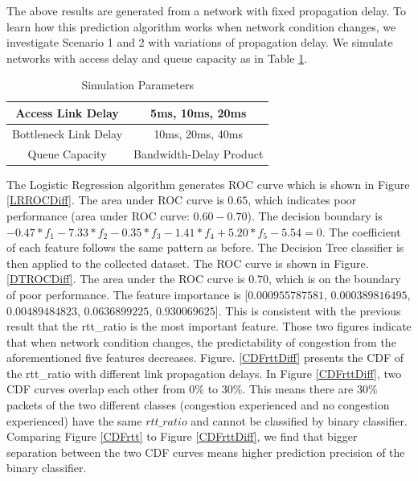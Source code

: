 
\par The above results are generated from a network with fixed propagation delay. To learn how this prediction algorithm works when network condition changes, we investigate Scenario 1 and 2 with variations of propagation delay. We simulate networks with access delay and queue capacity as in Table \ref{tab:varyRTT}.
\begin{table}
\begin{center}
\caption {Simulation Parameters} \label{tab:varyRTT}
\begin{tabular}{ |c|c| }
 \hline
 Access Link Delay & 5ms, 10ms, 20ms  \\
 \hline
 Bottleneck Link Delay & 10ms, 20ms, 40ms\\
 \hline
 Queue Capacity & Bandwidth-Delay Product\\
 \hline
\end{tabular}
\end{center}
\end{table}
The Logistic Regression algorithm generates ROC curve which is shown in Figure \ref{LRROCDiff}. The area under ROC curve is $0.65$, which indicates poor performance (area under ROC curve: $0.60-0.70$). The decision boundary is $ -0.47*f_{1} - 7.33*f_{2} - 0.35
*f_{3} - 1.41*f_{4} + 5.20*f_{5} - 5.54 = 0$. The coefficient of each feature follows the same pattern as before. The Decision Tree classifier is then applied to the collected dataset. The ROC curve is shown in Figure. \ref{DTROCDiff}. The area under the ROC curve is $0.70$, which is on the boundary of poor performance. The feature importance is [$0.000955787581$, $0.000389816495$, $0.00489484823$, $0.0636899225$, $0.930069625$]. This is consistent with the previous result that the rtt\_ratio is the most important feature. Those two figures indicate that when network condition changes, the predictability of congestion from the aforementioned five features decreases. Figure. \ref{CDFrttDiff} presents the CDF of the rtt\_ratio with different link propagation delays. In Figure \ref{CDFrttDiff}, two CDF curves overlap each other from $0\%$ to $30\%$. This means there are $30\%$ packets of the two different classes (congestion experienced and no congestion experienced) have the same $rtt\_ratio$ and cannot be classified by binary classifier. Comparing Figure \ref{CDFrtt} to Figure \ref{CDFrttDiff}, we find that bigger separation between the two CDF curves means higher prediction precision of the binary classifier. 
